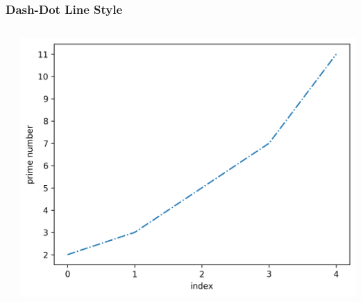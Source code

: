 \documentclass[xcolor={svgnames}]{beamer}
\newcommand{\pyfile}[2][]{}
\begin{document}
\begin{frame}[t,fragile]
    \frametitle{Dash-Dot Line Style}
    \vspace{5mm}
    \begin{columns}[T]
        \begin{column}{0.52\textwidth}
            \pyfile{examples/13-dash-dot-line-style.py}
        \end{column}
        \begin{column}{0.48\textwidth}
            \includegraphics[width=\textwidth]{img/13-dash-dot-line-style.png}
        \end{column}
    \end{columns}
\end{frame}
\end{document}
